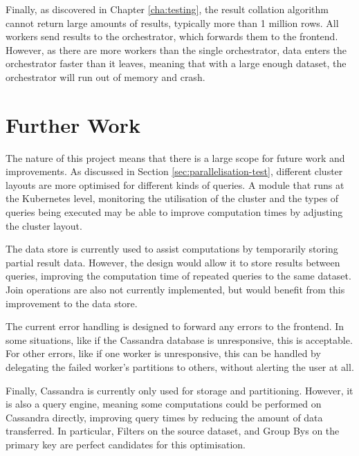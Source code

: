 Finally, as discovered in Chapter \ref{cha:testing}, the result collation algorithm cannot return large amounts of results, typically more than 1 million rows. All workers send results to the orchestrator, which forwards them to the frontend. However, as there are more workers than the single orchestrator, data enters the orchestrator faster than it leaves, meaning that with a large enough dataset, the orchestrator will run out of memory and crash.

\section{Further Work}
The nature of this project means that there is a large scope for future work and improvements. As discussed in Section \ref{sec:parallelisation-test}, different cluster layouts are more optimised for different kinds of queries. 
A module that runs at the Kubernetes level, monitoring the utilisation of the cluster and the types of queries being executed may be able to improve computation times by adjusting the cluster layout.

The data store is currently used to assist computations by temporarily storing partial result data. However, the design would allow it to store results between queries, improving the computation time of repeated queries to the same dataset. Join operations are also not currently implemented, but would benefit from this improvement to the data store. 

The current error handling is designed to forward any errors to the frontend. In some situations, like if the Cassandra database is unresponsive, this is acceptable. For other errors, like if one worker is unresponsive, this can be handled by delegating the failed worker's partitions to others, without alerting the user at all.

Finally, Cassandra is currently only used for storage and partitioning. However, it is also a query engine, meaning some computations could be performed on Cassandra directly, improving query times by reducing the amount of data transferred. In particular, Filters on the source dataset, and Group Bys on the primary key are perfect candidates for this optimisation.


